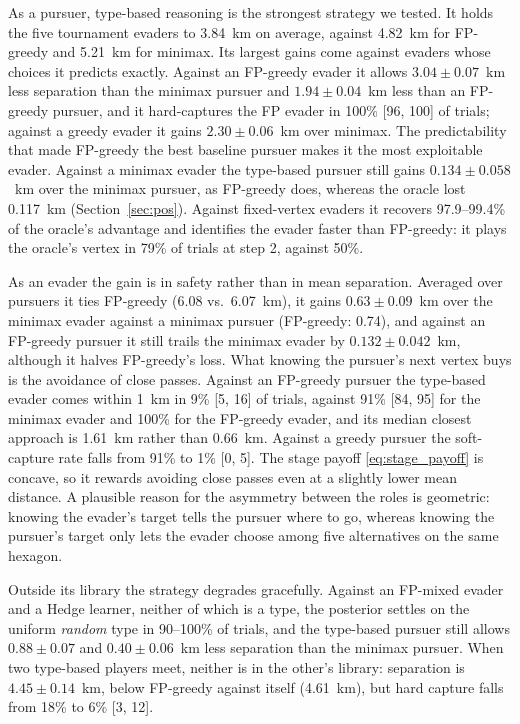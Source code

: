 \documentclass[letterpaper, 10 pt, conference]{ieeeconf}  %
\begin{document}
As a pursuer, type-based reasoning is the strongest strategy we tested. It holds the five tournament evaders to 3.84~km on average, against 4.82~km for FP-greedy and 5.21~km for minimax. Its largest gains come against evaders whose choices it predicts exactly. Against an FP-greedy evader it allows $3.04 \pm 0.07$~km less separation than the minimax pursuer and $1.94 \pm 0.04$~km less than an FP-greedy pursuer, and it hard-captures the FP evader in 100\% [96, 100] of trials; against a greedy evader it gains $2.30 \pm 0.06$~km over minimax. The predictability that made FP-greedy the best baseline pursuer makes it the most exploitable evader. Against a minimax evader the type-based pursuer still gains $0.134 \pm 0.058$~km over the minimax pursuer, as FP-greedy does, whereas the oracle lost 0.117~km (Section~\ref{sec:pos}). Against fixed-vertex evaders it recovers 97.9--99.4\% of the oracle's advantage and identifies the evader faster than FP-greedy: it plays the oracle's vertex in 79\% of trials at step 2, against 50\%.

As an evader the gain is in safety rather than in mean separation. Averaged over pursuers it ties FP-greedy (6.08 vs.\ 6.07~km), it gains $0.63 \pm 0.09$~km over the minimax evader against a minimax pursuer (FP-greedy: 0.74), and against an FP-greedy pursuer it still trails the minimax evader by $0.132 \pm 0.042$~km, although it halves FP-greedy's loss. What knowing the pursuer's next vertex buys is the avoidance of close passes. Against an FP-greedy pursuer the type-based evader comes within 1~km in 9\% [5, 16] of trials, against 91\% [84, 95] for the minimax evader and 100\% for the FP-greedy evader, and its median closest approach is 1.61~km rather than 0.66~km. Against a greedy pursuer the soft-capture rate falls from 91\% to 1\% [0, 5]. The stage payoff \eqref{eq:stage_payoff} is concave, so it rewards avoiding close passes even at a slightly lower mean distance. A plausible reason for the asymmetry between the roles is geometric: knowing the evader's target tells the pursuer where to go, whereas knowing the pursuer's target only lets the evader choose among five alternatives on the same hexagon.

Outside its library the strategy degrades gracefully. Against an FP-mixed evader and a Hedge learner, neither of which is a type, the posterior settles on the uniform \emph{random} type in 90--100\% of trials, and the type-based pursuer still allows $0.88 \pm 0.07$ and $0.40 \pm 0.06$~km less separation than the minimax pursuer. When two type-based players meet, neither is in the other's library: separation is $4.45 \pm 0.14$~km, below FP-greedy against itself (4.61~km), but hard capture falls from 18\% to 6\% [3, 12].
\end{document}
